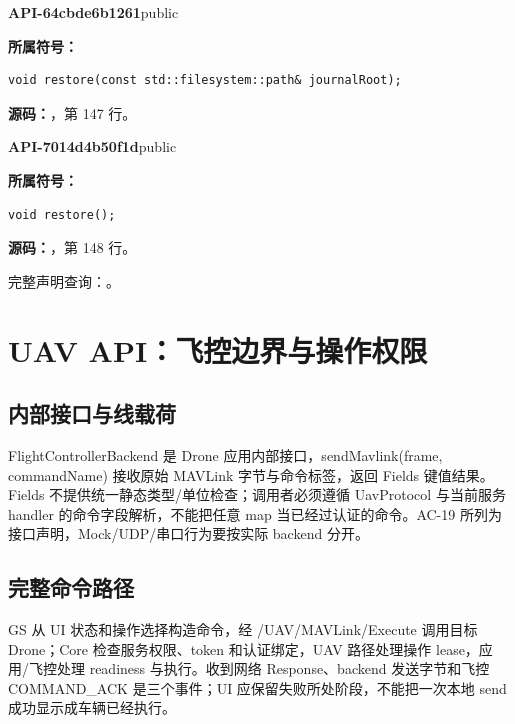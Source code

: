 \textbf{API-64cbde6b1261}\quad public\par
\textbf{所属符号：}\par
\begin{Verbatim}[fontsize=\footnotesize,breaklines,breakanywhere]
void restore(const std::filesystem::path& journalRoot);
\end{Verbatim}
\textbf{源码：}，第 147 行。\par

\textbf{API-7014d4b50f1d}\quad public\par
\textbf{所属符号：}\par
\begin{Verbatim}[fontsize=\footnotesize,breaklines,breakanywhere]
void restore();
\end{Verbatim}
\textbf{源码：}，第 148 行。\par

完整声明查询：。

\section{UAV API：飞控边界与操作权限}

\subsection{内部接口与线载荷}
FlightControllerBackend 是 Drone 应用内部接口，sendMavlink(frame, commandName) 接收原始 MAVLink 字节与命令标签，返回 Fields 键值结果。Fields 不提供统一静态类型/单位检查；调用者必须遵循 UavProtocol 与当前服务 handler 的命令字段解析，不能把任意 map 当已经过认证的命令。AC-19 所列为接口声明，Mock/UDP/串口行为要按实际 backend 分开。

\subsection{完整命令路径}
GS 从 UI 状态和操作选择构造命令，经 /UAV/MAVLink/Execute 调用目标 Drone；Core 检查服务权限、token 和认证绑定，UAV 路径处理操作 lease，应用/飞控处理 readiness 与执行。收到网络 Response、backend 发送字节和飞控 COMMAND\_ACK 是三个事件；UI 应保留失败所处阶段，不能把一次本地 send 成功显示成车辆已经执行。

